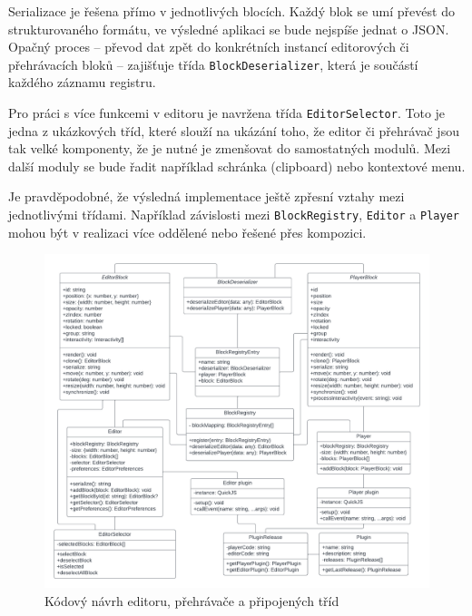 Serializace je řešena přímo v jednotlivých blocích.
Každý blok se umí převést do strukturovaného formátu, ve výsledné aplikaci se bude nejspíše jednat o JSON.
Opačný proces -- převod dat zpět do konkrétních instancí editorových či přehrávacích bloků -- zajišťuje třída \texttt{BlockDeserializer}, která je součástí každého záznamu registru.

Pro práci s více funkcemi v editoru je navržena třída \texttt{EditorSelector}. 
Toto je jedna z ukázkových tříd, které slouží na ukázání toho, že editor či přehrávač jsou tak velké komponenty, že je nutné je zmenšovat do samostatných modulů.
Mezi další moduly se bude řadit například schránka (clipboard) nebo kontextové menu. 

Je pravděpodobné, že výsledná implementace ještě zpřesní vztahy mezi jednotlivými třídami.
Například závislosti mezi \texttt{BlockRegistry}, \texttt{Editor} a \texttt{Player} mohou být v realizaci více oddělené nebo řešené přes kompozici.

\begin{figure}[ht!]
    \centering
    \includegraphics[width=1\textwidth]{media/04_navrh/kodovyNavrh.pdf}
    \caption{Kódový návrh editoru, přehrávače a připojených tříd}
    \label{fig:kodovyNavrhEditoruAPrehravace}
\end{figure}



